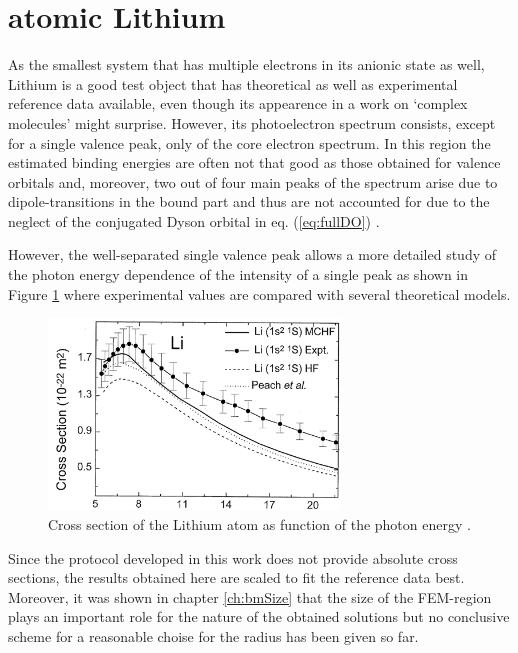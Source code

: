 \section{atomic Lithium}
\label{ch:resLI}
As the smallest system that has multiple electrons in its anionic state as well, Lithium is a good test object that has theoretical as well as experimental reference data available, \cite{Li-R,Li-R1, LiNaRef1} even though its appearence in a work on `complex molecules' might surprise.
However, its photoelectron spectrum consists, except for a single valence peak, only of the core electron spectrum.
In this region the estimated binding energies are often not that good as those obtained for valence orbitals and, moreover, two out of four main peaks of the spectrum arise due to dipole-transitions in the bound part and thus are not accounted for due to the neglect of the conjugated Dyson orbital in eq. (\ref{eq:fullDO}) \cite{saPonzi}.
%

However, the well-separated single valence peak allows a more detailed study of the photon energy dependence of the intensity of a single peak as shown in Figure \ref{fig:Lith-cs} where experimental values are compared with several theoretical models.
\begin{figure}
\includegraphics[width=0.69\textwidth]{Figures/Lithium/Li_crossSect}
\caption{Cross section of the Lithium atom as function of the photon energy \cite{LiCS}.}
\label{fig:Lith-cs}
\end{figure}
Since the protocol developed in this work does not provide absolute cross sections, the results obtained here are scaled to fit the reference data best.
Moreover, it was shown in chapter \ref{ch:bmSize} that the size of the FEM-region plays an important role for the nature of the obtained solutions but no conclusive scheme for a reasonable choise for the radius has been given so far.


